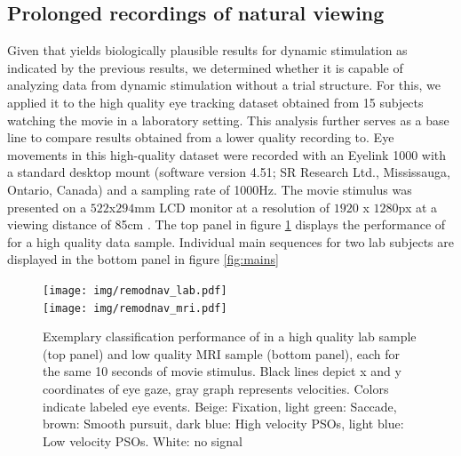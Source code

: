 


\subsection*{Prolonged recordings of natural viewing}\label{ana_2}


Given that \remodnav yields biologically plausible results for dynamic stimulation as indicated by the previous
results, we determined whether it is capable of analyzing data from dynamic stimulation without a trial structure.
For this, we applied it to the high quality eye tracking dataset obtained from 15 subjects watching the movie in a
laboratory setting. This analysis further serves as a base line to compare results obtained from a lower quality
recording to. Eye movements in this high-quality dataset were recorded with an Eyelink 1000 with a standard desktop
mount (software version 4.51; SR Research Ltd., Mississauga, Ontario, Canada) and a sampling rate of 1000Hz. The
movie stimulus was presented on a $522$x$294$mm LCD monitor at a resolution of $1920$ x $1280$px at a viewing
distance of 85cm \citep{Hanke2016}.
The top panel in figure \ref{fig:remodnav} displays the performance of \remodnav for a high quality data sample.
Individual main sequences for two lab subjects are displayed in the bottom panel in figure \ref{fig:mains}




\begin{figure}[h!]
    \texttt{[image: img/remodnav\_lab.pdf]} \\
    \texttt{[image: img/remodnav\_mri.pdf]}\\
    \caption{Exemplary classification performance of \remodnav in a high quality lab sample (top panel) and low
    quality MRI sample (bottom panel), each for the same 10 seconds of movie stimulus.
    Black lines depict x and y coordinates of eye gaze, gray graph represents velocities. Colors indicate labeled
    eye events. Beige: Fixation,
    light green: Saccade, brown: Smooth pursuit, dark blue: High velocity PSOs, light blue: Low velocity PSOs.
    White: no signal}
    \label{fig:remodnav}
\end{figure}

